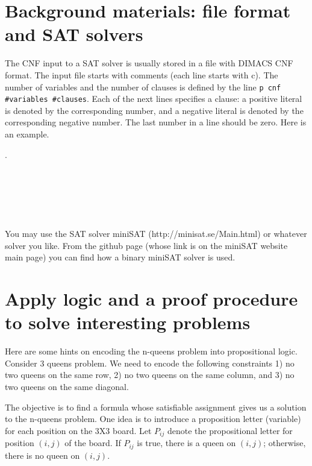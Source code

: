 \documentclass[12pt, letterpaper]{article}
\begin{document}


\section{Background materials: file format and SAT solvers}

The CNF input to a SAT solver is usually stored in a file with
DIMACS CNF format. The input file starts with comments (each line
starts with c). The number of variables and the number of clauses is
defined by the line {\tt p cnf \#variables \#clauses}. Each of the
next lines specifies a clause: a positive literal is denoted by the
corresponding number, and a negative literal is denoted by the
corresponding negative number. The last number in a line should be
zero. Here is an example.

\noindent {}. \\
 \\
 \\
 \\
 \\
 \\


You may use the SAT solver miniSAT  (http://minisat.se/Main.html) or whatever solver you like. From the github page (whose link is on the miniSAT website main page) you can find how a binary miniSAT solver is used. 

\section{Apply logic and a proof procedure to solve interesting
problems}

Here are some hints on encoding the n-queens problem into
propositional logic. Consider 3 queens problem. We need to encode
the following constraints 1) no two queens on the same row, 2) no
two queens on the same column, and 3) no two queens on the same
diagonal.

The objective is to find a formula whose satisfiable assignment
gives us a solution to the n-queens problem. One idea is to
introduce a proposition letter (variable) for each position on the
3X3 board. Let $P_{ij}$ denote the propositional letter for position
$(i,j)$ of the board. If $P_{ij}$ is true, there is a queen on
$(i,j)$; otherwise, there is no queen on $(i,j)$.
\end{document}
